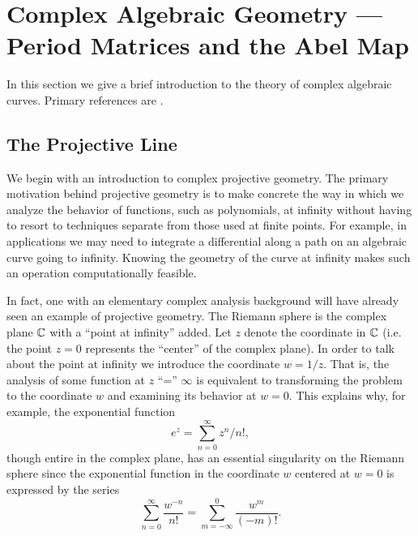 \section{Complex Algebraic Geometry --- Period Matrices and the Abel Map}

In this section we give a brief introduction to the theory of complex
algebraic curves. Primary references are \cite{Ueno97,Griffiths89}.

\subsection{The Projective Line}

We begin with an introduction to complex projective geometry. The
primary motivation behind projective geometry is to make concrete the
way in which we analyze the behavior of functions, such as polynomials,
at infinity without having to resort to techniques separate from those
used at finite points. For example, in applications we may need to
integrate a differential along a path on an algebraic curve going to
infinity. Knowing the geometry of the curve at infinity makes such an
operation computationally feasible.

In fact, one with an elementary complex analysis background will have
already seen an example of projective geometry. The Riemann sphere is
the complex plane $\operatorname{\mathbb{C}}$ with a ``point at infinity'' added. Let $z$
denote the coordinate in $\operatorname{\mathbb{C}}$ (i.e. the point $z=0$ represents the
``center'' of the complex plane). In order to talk about the point at
infinity we introduce the coordinate $w = 1/z$. That is, the analysis of
some function at $z$ ``='' $\infty$ is equivalent to transforming the
problem to the coordinate $w$ and examining its behavior at $w=0$. This
explains why, for example, the exponential function
\[
    e^z = \sum_{n=0}^\infty z^n / n!,
\]
though entire in the complex plane, has an essential singularity on the
Riemann sphere since the exponential function in the coordinate $w$
centered at $w=0$ is expressed by the series
\[
    \sum_{n=0}^\infty \frac{w^{-n}}{n!}
    =
    \sum_{m=-\infty}^0 \frac{w^m}{(-m)!}.
\]

